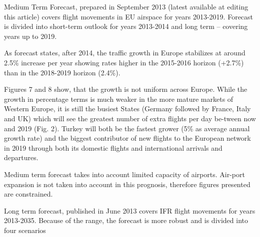 Medium Term Forecast, prepared in September 2013 (latest available at editing this article) covers flight movements in EU airspace for years 2013-2019. Forecast is divided into short-term outlook for years 2013-2014 and long term – covering years up to 2019.

As forecast states, after 2014, the traffic growth in Europe stabilizes at around 2.5\% increase per year showing rates higher in the 2015-2016 horizon (+2.7\%) than in the 2018-2019 horizon (2.4\%).

Figures 7 and 8 show, that the growth is not uniform across Europe. While the growth in percentage terms is much weaker in the more mature markets of Western Europe, it is still the busiest States (Germany followed by France, Italy and UK) which will see the greatest number of extra flights per day be-tween now and 2019 (Fig. 2). Turkey will both be the fastest grower (5\% as average annual growth rate) and the biggest contributor of new flights to the European network in 2019 through both its domestic flights and international arrivals and departures.

Medium term forecast takes into account limited capacity of airports. Air-port expansion is not taken into account in this prognosis, therefore figures presented are constrained.

Long term forecast, published in June 2013 covers IFR flight movements for years 2013-2035. Because of the range, the forecast is more robust and is divided into four scenarios \citep{growth_2013}

